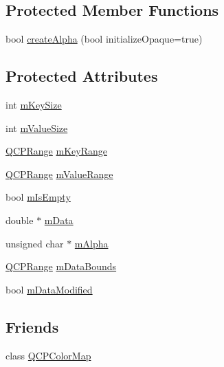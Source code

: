 \subsection*{Protected Member Functions}
\begin{DoxyCompactItemize}
\item 
bool \mbox{\hyperlink{class_q_c_p_color_map_data_a42c2b1c303683515fa4de4c551f54441}{create\+Alpha}} (bool initialize\+Opaque=true)
\end{DoxyCompactItemize}
\subsection*{Protected Attributes}
\begin{DoxyCompactItemize}
\item 
int \mbox{\hyperlink{class_q_c_p_color_map_data_a354e06462023340fbc03894b22499f6d}{m\+Key\+Size}}
\item 
int \mbox{\hyperlink{class_q_c_p_color_map_data_ae8ee9093632a59f55eb4fc06579ed256}{m\+Value\+Size}}
\item 
\mbox{\hyperlink{class_q_c_p_range}{Q\+C\+P\+Range}} \mbox{\hyperlink{class_q_c_p_color_map_data_aaaafd0d7d0f153dbd152f3daf34254ee}{m\+Key\+Range}}
\item 
\mbox{\hyperlink{class_q_c_p_range}{Q\+C\+P\+Range}} \mbox{\hyperlink{class_q_c_p_color_map_data_a225bb96f10c1a27b51ae59249477dbef}{m\+Value\+Range}}
\item 
bool \mbox{\hyperlink{class_q_c_p_color_map_data_a10e91aa89ed05bd177b1f81e07b465b8}{m\+Is\+Empty}}
\item 
double $\ast$ \mbox{\hyperlink{class_q_c_p_color_map_data_ac1682862022f575191351c9825187d39}{m\+Data}}
\item 
unsigned char $\ast$ \mbox{\hyperlink{class_q_c_p_color_map_data_a2146560b3a61a41186f9aa5ed9ec37a6}{m\+Alpha}}
\item 
\mbox{\hyperlink{class_q_c_p_range}{Q\+C\+P\+Range}} \mbox{\hyperlink{class_q_c_p_color_map_data_a1798b3dcc0a27091d196bfd156dcb3f2}{m\+Data\+Bounds}}
\item 
bool \mbox{\hyperlink{class_q_c_p_color_map_data_ad3cc682da2ac14e5acdbc05cf4d3d93b}{m\+Data\+Modified}}
\end{DoxyCompactItemize}
\subsection*{Friends}
\begin{DoxyCompactItemize}
\item 
class \mbox{\hyperlink{class_q_c_p_color_map_data_afa9d9eab63af3e6f20f882c8d7cc9f20}{Q\+C\+P\+Color\+Map}}
\end{DoxyCompactItemize}


